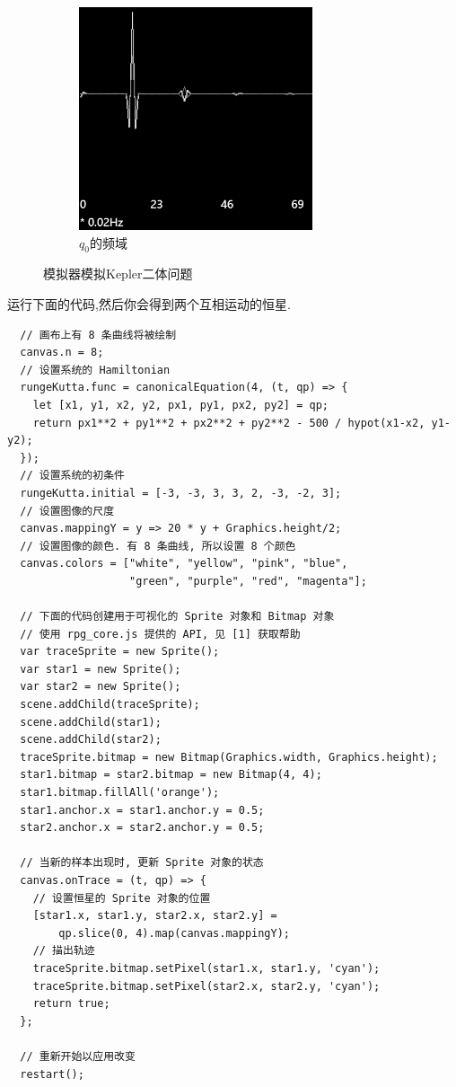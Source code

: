 \documentclass[12pt]{article}
\begin{document}
\begin{figure}[h]
\begin{subfigure}[b]{0.2\linewidth}
    \includegraphics[width=\linewidth]{kepler_2_body_q0_frequencies.png}
    \caption{$q_0$的频域}
  \end{subfigure}
  \caption{模拟器模拟Kepler二体问题}
  \label{fig:kepler}
\end{figure}

运行下面的代码,然后你会得到两个互相运动的恒星.

\begin{verbatim}
  // 画布上有 8 条曲线将被绘制
  canvas.n = 8;
  // 设置系统的 Hamiltonian
  rungeKutta.func = canonicalEquation(4, (t, qp) => {
    let [x1, y1, x2, y2, px1, py1, px2, py2] = qp;
    return px1**2 + py1**2 + px2**2 + py2**2 - 500 / hypot(x1-x2, y1-y2);
  });
  // 设置系统的初条件
  rungeKutta.initial = [-3, -3, 3, 3, 2, -3, -2, 3];
  // 设置图像的尺度
  canvas.mappingY = y => 20 * y + Graphics.height/2;
  // 设置图像的颜色. 有 8 条曲线, 所以设置 8 个颜色
  canvas.colors = ["white", "yellow", "pink", "blue",
                   "green", "purple", "red", "magenta"];

  // 下面的代码创建用于可视化的 Sprite 对象和 Bitmap 对象
  // 使用 rpg_core.js 提供的 API, 见 [1] 获取帮助
  var traceSprite = new Sprite();
  var star1 = new Sprite();
  var star2 = new Sprite();
  scene.addChild(traceSprite);
  scene.addChild(star1);
  scene.addChild(star2);
  traceSprite.bitmap = new Bitmap(Graphics.width, Graphics.height);
  star1.bitmap = star2.bitmap = new Bitmap(4, 4);
  star1.bitmap.fillAll('orange');
  star1.anchor.x = star1.anchor.y = 0.5;
  star2.anchor.x = star2.anchor.y = 0.5;

  // 当新的样本出现时, 更新 Sprite 对象的状态
  canvas.onTrace = (t, qp) => {
    // 设置恒星的 Sprite 对象的位置
    [star1.x, star1.y, star2.x, star2.y] =
        qp.slice(0, 4).map(canvas.mappingY);
    // 描出轨迹
    traceSprite.bitmap.setPixel(star1.x, star1.y, 'cyan');
    traceSprite.bitmap.setPixel(star2.x, star2.y, 'cyan');
    return true;
  };

  // 重新开始以应用改变
  restart();
\end{verbatim}
\end{document}
